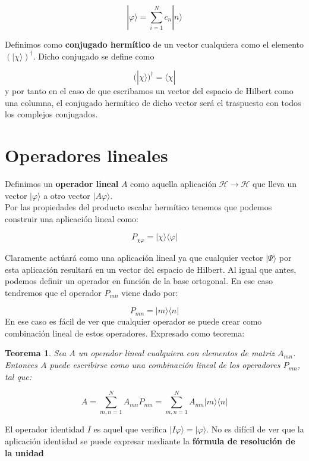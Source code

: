 \documentclass[12pt,a4paper]{book}
\numberwithin{equation}{chapter}
\numberwithin{figure}{chapter}
\newtheorem{theorem}{Teorema}[section]
\begin{document}
\begin{equation}
| \varphi \rangle = \sum_{i=1}^N c_n | n \rangle
\end{equation}

Definimos como \textbf{conjugado hermítico} de un vector cualquiera como el elemento $(| \chi \rangle )^\dagger$. Dicho conjugado se define como

\begin{equation}
(| \chi \rangle )^\dagger = \langle \chi |
\end{equation}
y por tanto en el caso de que escribamos un vector del espacio de Hilbert como una columna, el conjugado hermítico de dicho vector será el traspuesto con todos los complejos conjugados. 

\section{Operadores lineales}

Definimos un \textbf{operador lineal} $A$ como aquella aplicación $\mathcal{H} \rightarrow \mathcal{H}$ que lleva un vector $| \varphi \rangle$ a otro vector $|A \varphi \rangle$. \\

Por las propiedades del producto escalar hermítico tenemos que podemos construir una aplicación lineal como:

\begin{equation}
P_{\chi \varphi} = | \chi \rangle \langle \varphi | \label{Ec:01.02-01}
\end{equation}

Claramente actúará como una aplicación lineal ya que cualquier vector $| \Psi \rangle$ por esta aplicación resultará en un vector del espacio de Hilbert. Al igual que antes, podemos definir un operador en función de la base ortogonal. En ese caso tendremos que el operador $P_{mn}$ viene dado por:

\begin{equation}
P_{mn} = | m \rangle \langle n |
\end{equation}
En ese caso es fácil de ver que cualquier operador se puede crear como combinación lineal de estos operadores. Expresado como teorema:

\begin{theorem}
Sea $A$ un operador lineal cualquiera con elementos de matriz $A_{mn}$. Entonces $A$ puede escribirse como una combinación lineal de los operadores $P_{mn}$, tal que:

\begin{equation}
A = \sum_{m,n=1}^N A_{mn} P_{mn} = \sum_{m,n=1}^N A_{mn} | m \rangle \langle n | 
\end{equation} 
\end{theorem}
El operador identidad $I$ es aquel que verifica $|I \varphi \rangle = | \varphi \rangle$. No es difícil de ver que la aplicación identidad se puede expresar mediante la \textbf{fórmula de resolución de la unidad}
\end{document}

